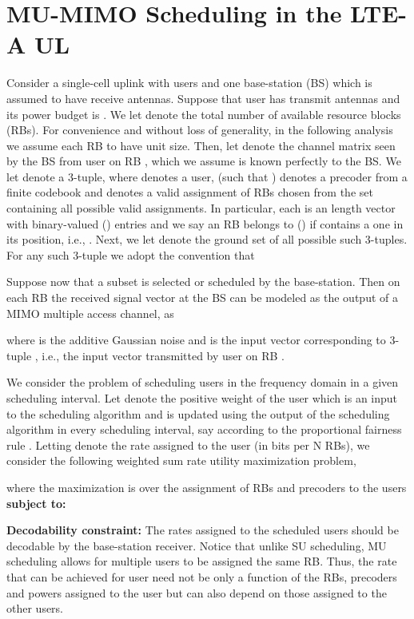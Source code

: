 \documentclass[11pt] {article}
\begin{document}
\section{MU-MIMO Scheduling in the  LTE-A UL}\label{sec:musetup}
Consider a single-cell uplink with  users and one base-station (BS) which is assumed to have  receive antennas. Suppose that user  has  transmit antennas and its power budget is . We let   denote the total number of available resource blocks (RBs). For convenience and without loss of generality, in the following analysis we assume each RB to have unit size.  Then, let  denote the  channel matrix seen by the BS from user  on RB , which we assume is known perfectly to the BS. We let  denote a 3-tuple, where  denotes a user,  (such that ) denotes a precoder from a finite codebook  and  denotes a valid assignment of RBs chosen from the set  containing all possible valid assignments. In particular, each  is an length vector with binary-valued () entries and we say an RB  belongs to  () if  contains a one in its  position, i.e., . Next, we let   denote the ground set of all possible such 3-tuples. For any such 3-tuple we adopt the convention that

Suppose now that a subset  is selected or scheduled by the base-station. Then on each RB   the received signal vector at the BS can be modeled as the output of a MIMO multiple access channel, as

where
  is the additive Gaussian noise and  is the input vector corresponding to 3-tuple , i.e., the input vector transmitted by user  on RB .








We consider the problem of scheduling users in the frequency domain in a given scheduling interval. Let  denote the positive weight of the  user which is an input to the scheduling algorithm and is updated using the output of the scheduling algorithm in every scheduling interval, say according to the proportional fairness rule \cite{Liu-Knightly-2003}. Letting  denote the rate assigned to the  user (in bits per N RBs), we consider the following weighted sum rate utility maximization problem,

where the maximization is over the assignment of RBs and  precoders to the users
\textbf{subject to:}





  \textbf{Decodability constraint:} The rates assigned to the scheduled users should be decodable by the base-station receiver. Notice that unlike SU scheduling, MU scheduling allows for multiple users to be assigned the same RB. Thus, the rate that can be achieved for user  need not be only a function of the RBs, precoders and powers assigned to the  user but can also depend on  those assigned to the other users. 
\end{document}
